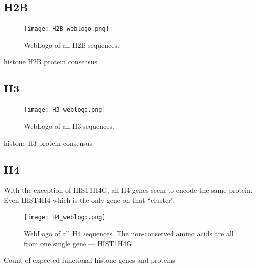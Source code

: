\documentclass[10pt,a4paper,draft]{article}
\begin{document}
    \subsection{H2B}
      \begin{figure}
        \centering
        \texttt{[image: H2B\_weblogo.png]}
        \caption{WebLogo of all H2B sequences.}
        \label{fig:h2b-weblogo}
      \end{figure}
      \begin{table}
        \centering
        
        \caption{histone H2B protein consensus}
        \label{tab:H2B-consensus}
      \end{table}

    \subsection{H3}
      \begin{figure}
        \centering
        \texttt{[image: H3\_weblogo.png]}
        \caption{WebLogo of all H3 sequences.}
        \label{fig:h3-weblogo}
      \end{figure}
      \begin{table}
        \centering
        
        \caption{histone H3 protein consensus}
        \label{tab:H3-consensus}
      \end{table}

    \subsection{H4}
      With the exception of HIST1H4G, all H4 genes seem to encode the same protein. Even HIST4H4 which is the
      only gene on that ``cluster''.
      \begin{figure}
        \centering
        \texttt{[image: H4\_weblogo.png]}
        \caption{WebLogo of all H4 sequences. The non-conserved amino acids are all from one single gene --- HIST1H4G}
        \label{fig:h4-weblogo}
      \end{figure}

      \begin{table}
        \centering
        
        \caption{Count of expected functional histone genes and proteins}
        \label{tab:H4-consensus}
      \end{table}
\end{document}
